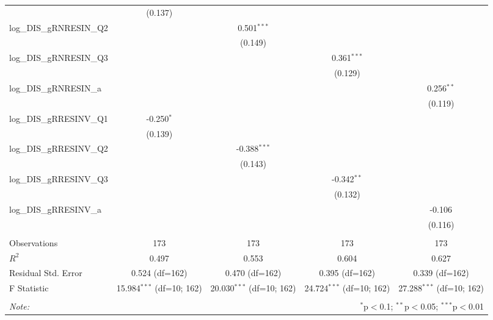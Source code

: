 \begin{table}[!htbp]
\begin{tabular}{@{\extracolsep{5pt}}lcccc}
& (0.137) & & & \\
 log_DIS_gRNRESIN_Q2 & & 0.501$^{***}$ & & \\
& & (0.149) & & \\
 log_DIS_gRNRESIN_Q3 & & & 0.361$^{***}$ & \\
& & & (0.129) & \\
 log_DIS_gRNRESIN_a & & & & 0.256$^{**}$ \\
& & & & (0.119) \\
 log_DIS_gRRESINV_Q1 & -0.250$^{*}$ & & & \\
& (0.139) & & & \\
 log_DIS_gRRESINV_Q2 & & -0.388$^{***}$ & & \\
& & (0.143) & & \\
 log_DIS_gRRESINV_Q3 & & & -0.342$^{**}$ & \\
& & & (0.132) & \\
 log_DIS_gRRESINV_a & & & & -0.106$^{}$ \\
& & & & (0.116) \\
\hline \\[-1.8ex]
 Observations & 173 & 173 & 173 & 173 \\
 $R^2$ & 0.497 & 0.553 & 0.604 & 0.627 \\
 Residual Std. Error & 0.524 (df=162) & 0.470 (df=162) & 0.395 (df=162) & 0.339 (df=162) \\
 F Statistic & 15.984$^{***}$ (df=10; 162) & 20.030$^{***}$ (df=10; 162) & 24.724$^{***}$ (df=10; 162) & 27.288$^{***}$ (df=10; 162) \\
\hline
\hline \\[-1.8ex]
\textit{Note:} & \multicolumn{4}{r}{$^{*}$p$<$0.1; $^{**}$p$<$0.05; $^{***}$p$<$0.01} \\
\end{tabular}
\end{table}